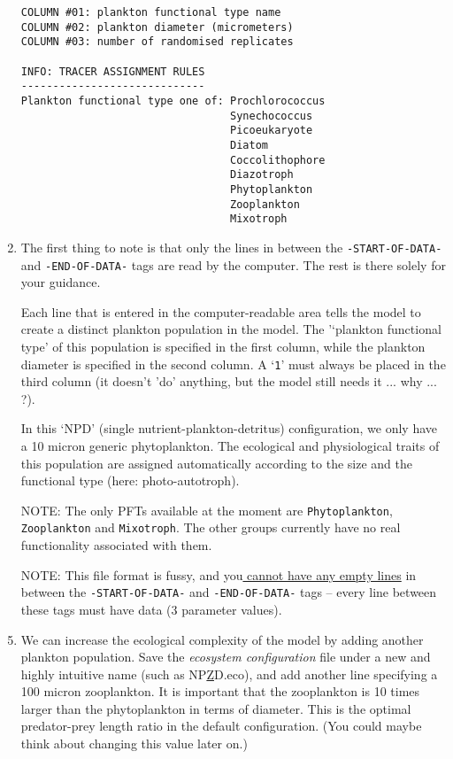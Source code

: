 \documentclass[11pt,fleqn]{book} %
\begin{document}
\begin{enumerate}[noitemsep]
\begin{verbatim}
COLUMN #01: plankton functional type name
COLUMN #02: plankton diameter (micrometers)
COLUMN #03: number of randomised replicates

INFO: TRACER ASSIGNMENT RULES
-----------------------------
Plankton functional type one of: Prochlorococcus
                                 Synechococcus
                                 Picoeukaryote
                                 Diatom
                                 Coccolithophore
                                 Diazotroph
                                 Phytoplankton
                                 Zooplankton
                                 Mixotroph
\end{verbatim}\normalsize

\newpage

\vspace{1mm}
\item The first thing to note is that only the lines in between the \texttt{\small -START-OF-DATA-} and \texttt{\small -END-OF-DATA-} tags are read by the computer. The rest is there solely for your guidance.

Each line that is entered in the computer-readable area tells the model to create a distinct plankton population in the model. The '`plankton functional type' of this population is specified in the first column, while the plankton diameter is specified in the second column. A `\texttt{1}' must always be placed in the third column (it doesn't 'do' anything, but the model still needs it ...  why ... ?).

In this `NPD' (single nutrient-plankton-detritus) configuration, we only have a 10 micron generic phytoplankton. The ecological and physiological traits of this population are assigned automatically according to the size and the functional type (here: photo-autotroph).

\item[NOTE:] The only PFTs available at the moment are \texttt{Phytoplankton}, \texttt{Zooplankton} and \texttt{Mixotroph}. The other groups currently have no real functionality associated with them.

\item[NOTE:] This file format is fussy, and you\uline{ cannot have any empty lines} in between the  \texttt{\small -START-OF-DATA-} and \texttt{\small -END-OF-DATA-} tags -- every line between these tags must have data (3 parameter values).

\vspace{1mm}
\item We can increase the ecological complexity of the model by adding another plankton population. Save the \textit{ecosystem configuration} file under a new and highly intuitive name (such as \textsf{\footnotesize NP\underline{Z}D.eco}), and add another line specifying a 100 micron zooplankton. It is important that the zooplankton is 10 times larger than the phytoplankton in terms of diameter. This is the optimal predator-prey length ratio in the default configuration. (You could maybe think about changing this value later on.)


\end{enumerate}
\end{document}
